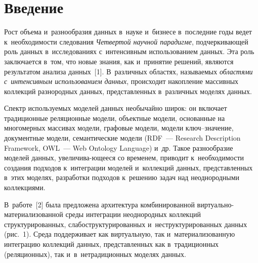 \thispagestyle{headings}

\begin{multicols}{2}

\label{st\stat}

\section{Введение}

\vspace*{-2pt}

      Рост объема и~разнообразия данных в~науке и~бизнесе в~последние годы 
ведет к~необходи\-мости следования \textit{Четвертой научной парадигме}, 
подчеркивающей роль данных в~исследованиях с~интенсивным использованием 
данных. Эта роль заключается в~том, что новые знания, как и~принятие 
решений, являются результатом анализа данных~[1]. В~различных областях, 
называемых \textit{областями с~интенсивным использованием данных}, 
происходит накопление массивных коллекций разнородных данных, 
представленных в~различных моделях данных.
      
      Спектр используемых моделей данных необычайно широк: он включает 
традиционные реляционные модели, объектные модели, основанные на 
многомерных массивах модели, графовые модели, модели ключ--зна\-че\-ние, 
документные модели, семантические модели (RDF~--- Research Description Framework, OWL~---
Web Ontology Language) и~др. Такое 
разнообразие моделей данных, увеличива-\linebreak ющееся со временем, приводит 
к~необходимости создания подходов к~интеграции моделей и~коллекций 
данных, представленных в~этих моделях, разработ\-ки подходов к~решению задач 
над неоднородными коллекциями. 

В~работе~[2] была предложена архитектура 
комбинированной вир\-ту\-аль\-но-ма\-те\-ри\-а\-ли\-зо\-ван\-ной среды интеграции 
неоднородных коллекций структурированных, слабоструктурированных 
и~неструктурированных данных (рис.~1). Среда поддерживает как 
виртуальную, так и~материализованную интеграцию коллекций данных, 
пред\-став\-лен\-ных как в~традиционных (реляционных), так и~в~нетрадиционных 
моделях данных. 

\begin{figure*}
 \vspace*{1pt}
 \begin{center}
 \mbox{%
 \epsfxsize=154.138mm
 }
 \end{center}
 \vspace*{-9pt}
\end{figure*}


\end{multicols}
